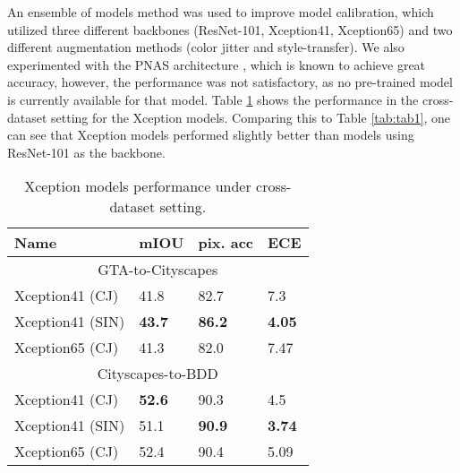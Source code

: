 \documentclass[conference]{IEEEtran}
\begin{document}
An ensemble of models method was used to improve model calibration, which utilized three different backbones (ResNet-101, Xception41, Xception65) and two different augmentation methods (color jitter and style-transfer). We also experimented with the PNAS architecture \cite{pnas}, which is known to achieve great accuracy, however, the performance was not satisfactory, as no pre-trained model is currently available for that model.  Table \ref{tab:models} shows the performance in the cross-dataset setting for the Xception models. Comparing this to Table \ref{tab:tab1}, one can see that Xception models performed slightly better than models using ResNet-101 as the backbone.

\begin{table}[t]
\centering
\caption{Xception models performance under cross-dataset setting.
}
\label{tab:models}
\begin{tabular}{|l|l|l|l|}
\hline
Name & mIOU & pix. acc & ECE\\
\hline
 \multicolumn{4}{|c|}{GTA-to-Cityscapes} \\
\hline
Xception41 (CJ) & 41.8 & 82.7 & 7.3 \\
\hline
Xception41 (SIN) & \textbf{43.7} & \textbf{86.2} & \textbf{4.05} \\
\hline
Xception65 (CJ) & 41.3 & 82.0 & 7.47 \\
\hline
\hline
\multicolumn{4}{|c|}{Cityscapes-to-BDD} \\
\hline
\hline
Xception41 (CJ) & \textbf{52.6} & 90.3 & 4.5\\
\hline
Xception41 (SIN) & 51.1 & \textbf{90.9} & \textbf{3.74} \\
\hline
Xception65 (CJ) & 52.4 & 90.4 & 5.09 \\
\hline
\end{tabular}
\end{table}
\end{document}
